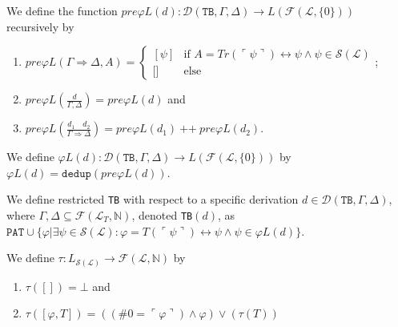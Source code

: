 \begin{definition}\label{def:Pre-Rel-Phis}
    \leanok
    We define the function $pre\varphi L(d) : \mathcal{D}(\texttt{TB},\Gamma,\Delta) \to L(\mathcal{F}(\mathcal{L},\{0\}))$ recursively by
    \begin{enumerate}
    \item $pre\varphi L(\Gamma \Rightarrow \Delta, A) = \begin{cases}
        [\psi] & \text{if } A = Tr(\ulcorner \psi \urcorner) \leftrightarrow \psi \wedge \psi \in \mathcal{S}(\mathcal{L}) \\
        \text{[]} & \text{else}
    \end{cases}$;
    \item $pre\varphi L(\frac{d}{\Gamma, \Delta}) = pre\varphi L(d)$ and
    \item $pre\varphi L(\frac{d_1 \quad d_2}{\Gamma \Rightarrow \Delta}) = pre\varphi L(d_1) ~\texttt{++}~ pre\varphi L(d_2)
$.
    \end{enumerate}
\end{definition} 

\begin{definition}\label{def:Rel-Phis}
    \leanok
     We define $\varphi L(d) : \mathcal{D}(\texttt{TB},\Gamma,\Delta) \to L(\mathcal{F}(\mathcal{L},\{0\}))$ by $\varphi L(d) = \texttt{dedup}(pre\varphi L(d))$.
\end{definition}

\begin{definition}\label{def:Restricted-TB}
\leanok
{}
We define restricted \texttt{TB} with respect to a specific derivation $d \in \mathcal{D}(\texttt{TB},\Gamma,\Delta)$, where $\Gamma, \Delta \subseteq \mathcal{F}(\mathcal{L}_{T},\mathbb{N})$, denoted \texttt{TB}$(d)$, as $\texttt{PAT} \cup \{φ | ∃ψ \in \mathcal{S}(\mathcal{L}) : φ = T(⌜ψ⌝) \leftrightarrow ψ \wedge \psi \in \varphi L(d)\}$.
\end{definition} 

\begin{definition}\label{def:Tau}
    \leanok
    We define $\tau : L_{\mathcal{S}(\mathcal{L})} \to \mathcal{F}(\mathcal{L},\mathbb{N})$ by
    \begin{enumerate}
    \item $\tau([]) = \bot$ and
    \item $\tau([\varphi,T]) = ((\#0 = \ulcorner \varphi \urcorner) \wedge \varphi) \vee (\tau(T))$	
    \end{enumerate}
\end{definition}

